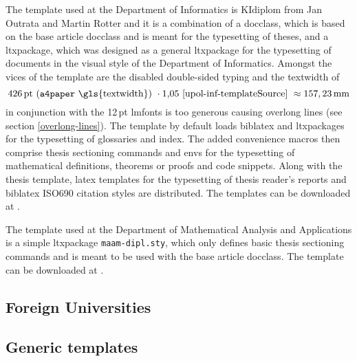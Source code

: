 \documentclass[12pt,twoside,cover,color,table]%
  {fithesis3/fithesis3/fithesis3} %
\begin{document}
   The template used at the Department of
  Informatics is KIdiplom from Jan Outrata and Martin Rotter and it
  is a combination of a \gls{docclass}, which is based on the base
  article \gls{docclass} and is meant for the typesetting of
  theses, and a \gls{ltxpackage}, which was designed as a general
  \gls{ltxpackage} for the typesetting of documents in the visual
  style of the Department of Informatics. Amongst the vices of the
  template are the disabled double-sided typing
  \cite[lines~69--72]{upol-inf-templateSource} and the
  \gls{textwidth} of\begin{equation}
    426\text{\,pt}\text{ (\texttt{a4paper} \gls{textwidth}) }
    \cdot1{,}05\text{ \cite[line~81]{upol-inf-templateSource} }
    \approx157,23\text{\,mm}
  \end{equation} in conjunction with the 12\,pt \gls{lmfonts} is
  too generous \cite[lines~74--82]{upol-inf-templateSource} causing
  overlong lines (see section \ref{overlong-lines}). The template
  by default loads \gls{biblatex} and \glspl{ltxpackage} for the
  typesetting of glossaries and index. The added convenience macros
  then comprise thesis sectioning commands and \glspl{env} for the
  typesetting of mathematical definitions, theorems or proofs and
  code snippets. Along with the thesis template, \gls{latex}
  templates for the typesetting of thesis reader's
  reports and \gls{biblatex}
  ISO\hyph{}690 \cite{iso690-1,iso690-2} citation styles\pending{}
  are distributed. The templates can be downloaded at
  \cite{upol-inf-template}.

  The template used at the
  Department of Mathematical Analysis and Applications is a simple
  \gls{ltxpackage} \texttt{maam-dipl.sty}, which only defines basic
  thesis sectioning commands and is meant to be used with the base
  article \gls{docclass}. The template can be downloaded at
  \cite{upol-maam-template}.


  \subsection{Foreign Universities}
  \subsection{Generic templates}

\end{document}
